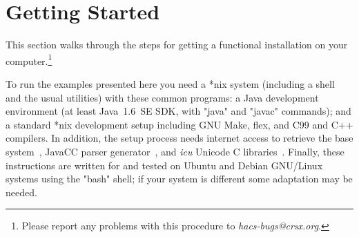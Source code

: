 \documentclass[11pt]{article} %
\begin{document}
\section{Getting Started}
\label{sec:run}

This section walks through the steps for getting a functional \HAX installation on your
computer.\footnote{Please report any problems with this procedure to \emph{hacs-bugs@crsx.org}.}

\begin{requirements}
  To run the \HAX examples presented here you need a *nix system (including a shell and the usual
  utilities) with these common programs: a Java development environment (at least Java~1.6~SE SDK,
  with "java" and "javac" commands); and a standard *nix development setup including GNU Make, flex,
  and C99 and C++ compilers. In addition, the setup process needs internet access to retrieve the
  \CRSX base system~\cite{crsx}, JavaCC parser generator~\cite{JavaCC}, and \emph{icu} Unicode C
  libraries~\cite{ICU}. Finally, these instructions are written for and tested on Ubuntu and Debian
  GNU/Linux systems using the "bash" shell; if your system is different some adaptation may be
  needed.
\end{requirements}
\end{document}
